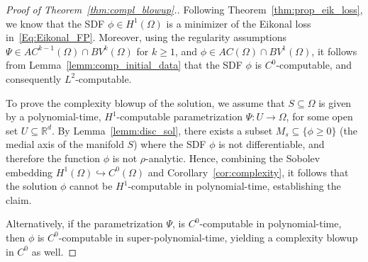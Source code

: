 \documentclass[pdflatex]{sn-jnl}%
\begin{document}
\vspace{-1em}\begin{proof}[Proof of Theorem~\ref{thm:compl_blowup}.]
   Following Theorem~\ref{thm:prop_eik_loss}, we know that the SDF $\phi\in H^1(\Omega)$ is a minimizer of the Eikonal loss in~\eqref{Eq:Eikonal_FP}. Moreover, using the regularity assumptions $\Psi\in AC^{k-1}(\Omega)\cap BV^k(\Omega)$ for $k\geq 1$, and $\phi\in AC(\Omega)\cap BV^1(\Omega)$,  it follows from Lemma~\ref{lemm:comp_initial_data} that the SDF $\phi$ is $C^0$-computable, and consequently $L^2$-computable.

   To prove the complexity blowup of the solution, we assume that \( S \subseteq \Omega \) is given by a polynomial-time, \( H^1 \)-computable parametrization \( \Psi: U \rightarrow \Omega \), for some open set \( U \subseteq \mathbb{R}^d \). By Lemma~\ref{lemm:disc_sol}, there exists a subset \( M_s \subseteq \{\phi\geq 0\} \) (the medial axis of the manifold $S$) where the SDF \( \phi \) is not differentiable, and therefore the function $\phi$ is not \( \rho \)-analytic. Hence, combining the Sobolev embedding $H^1(\Omega)\hookrightarrow C^0(\Omega)$ and  Corollary~\ref{cor:complexity}, it follows that the solution \( \phi \) cannot be \( H^1 \)-computable in polynomial-time, establishing the claim. 

   Alternatively, if the parametrization $\Psi$, is $C^0$-computable in polynomial-time, then $\phi$ is $C^0$-computable in super-polynomial-time, yielding a complexity blowup in $C^0$ as well.
\end{proof}
\end{document}
